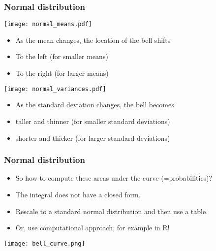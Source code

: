\documentclass[xcolor=dvipsnames, 9pt]{beamer} %
\begin{document}
\begin{frame}
\frametitle{Normal distribution}
\begin{center}
\texttt{[image: normal\_means.pdf]}
\begin{scriptsize}
\begin{itemize}
\item As the mean changes, the location of the bell shifts
\item[] To the left (for smaller means)
\item[] To the right (for larger means)
\end{itemize}
\end{scriptsize}
\end{center}
\begin{center}
\texttt{[image: normal\_variances.pdf]}
\begin{scriptsize}
\begin{itemize}
\item As the standard deviation changes, the bell becomes
\item[] taller and thinner (for smaller standard deviations)
\item[] shorter and thicker (for larger standard deviations)
\end{itemize}
\end{scriptsize}
\end{center}
\end{frame}

\begin{frame}
\frametitle{Normal distribution}
\begin{itemize}
	\itemsep\setlength{1em}
\item So how to compute these areas under the curve (=probabilities)? 
\item The integral does not have a closed form. 
\item Rescale to a standard normal distribution and then use a table.
\item Or, use computational approach, for example in \textsf{R}! 
\end{itemize}
\begin{center}
\texttt{[image: bell\_curve.png]}
\end{center}
\end{frame}
\end{document}
